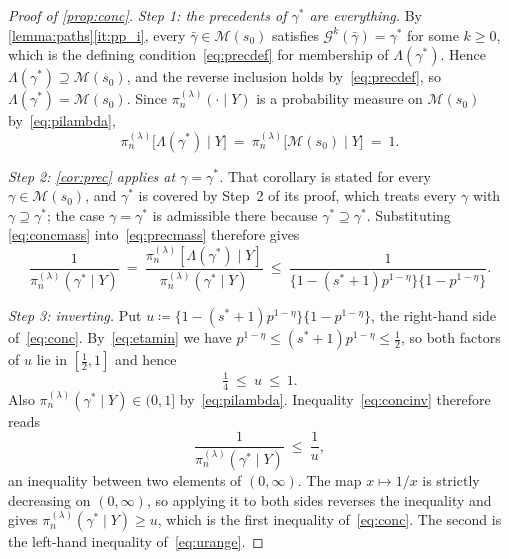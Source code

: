 \begin{proof}[Proof of \cref{prop:conc}]
    \emph{Step 1: the precedents of $\gamma^{\ast}$ are everything.} By
    \cref{lemma:paths}\ref{it:pp_i}, every $\bar\gamma\in\mathscr{M}(s_0)$
    satisfies $\mathcal{G}^{k}(\bar\gamma)=\gamma^{\ast}$ for some
    $k\geq0$, which is the defining condition~\eqref{eq:precdef} for
    membership of $\Lambda(\gamma^{\ast})$. Hence
    $\Lambda(\gamma^{\ast})\supseteq\mathscr{M}(s_0)$, and the reverse
    inclusion holds by~\eqref{eq:precdef}, so
    $\Lambda(\gamma^{\ast})=\mathscr{M}(s_0)$. Since
    $\pi_n^{(\lambda)}(\cdot\mid Y)$ is a probability measure on
    $\mathscr{M}(s_0)$ by~\eqref{eq:pilambda},
    \begin{equation}
        \label{eq:concmass}
        \pi_n^{(\lambda)}\bigl[\Lambda(\gamma^{\ast})\mid Y\bigr]
        \ =\ \pi_n^{(\lambda)}\bigl[\mathscr{M}(s_0)\mid Y\bigr]
        \ =\ 1 .
    \end{equation}

    \emph{Step 2: \cref{cor:prec} applies at $\gamma=\gamma^{\ast}$.}
    That corollary is stated for every $\gamma\in\mathscr{M}(s_0)$, and
    $\gamma^{\ast}$ is covered by Step~2 of its proof, which treats every
    $\gamma$ with $\gamma\supseteq\gamma^{\ast}$; the case
    $\gamma=\gamma^{\ast}$ is admissible there because
    $\gamma^{\ast}\supseteq\gamma^{\ast}$. Substituting
    \eqref{eq:concmass} into~\eqref{eq:precmass} therefore gives
    \begin{equation}
        \label{eq:concinv}
        \frac{1}{\pi_n^{(\lambda)}(\gamma^{\ast}\mid Y)}
        \ =\ \frac{\pi_n^{(\lambda)}[\Lambda(\gamma^{\ast})\mid Y]}
        {\pi_n^{(\lambda)}(\gamma^{\ast}\mid Y)}
        \ \leq\ \frac{1}
        {\bigl\{1-(s^{\ast}+1)p^{1-\eta}\bigr\}
        \bigl\{1-p^{1-\eta}\bigr\}} .
    \end{equation}

    \emph{Step 3: inverting.} Put
    $u\coloneq\bigl\{1-(s^{\ast}+1)p^{1-\eta}\bigr\}
    \bigl\{1-p^{1-\eta}\bigr\}$, the right-hand side
    of~\eqref{eq:conc}. By~\eqref{eq:etamin} we have
    $p^{1-\eta}\leq(s^{\ast}+1)p^{1-\eta}\leq\tfrac12$, so both factors
    of $u$ lie in $[\tfrac12,1]$ and hence
    \begin{equation}
        \label{eq:urange}
        \tfrac14\ \leq\ u\ \leq\ 1 .
    \end{equation}
    Also $\pi_n^{(\lambda)}(\gamma^{\ast}\mid Y)\in(0,1]$
    by~\eqref{eq:pilambda}. Inequality~\eqref{eq:concinv} therefore reads
    \begin{equation*}
        \frac{1}{\pi_n^{(\lambda)}(\gamma^{\ast}\mid Y)}
        \ \leq\ \frac{1}{u},
    \end{equation*}
    an inequality between two elements of $(0,\infty)$. The map
    $x\mapsto1/x$ is strictly decreasing on $(0,\infty)$, so applying it
    to both sides reverses the inequality and gives
    $\pi_n^{(\lambda)}(\gamma^{\ast}\mid Y)\geq u$, which is the first
    inequality of~\eqref{eq:conc}. The second is the left-hand
    inequality of~\eqref{eq:urange}.
\end{proof}


